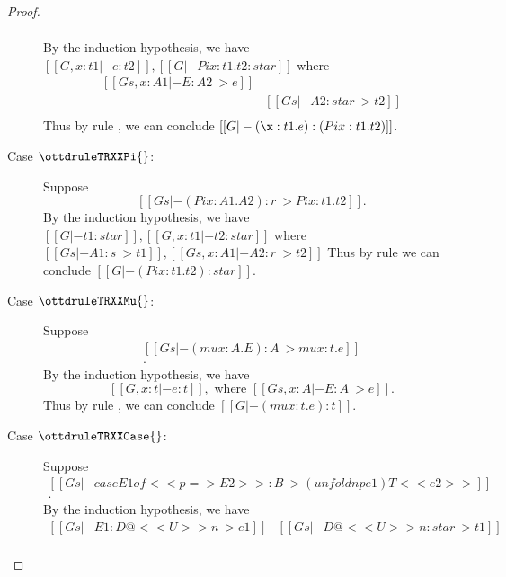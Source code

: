 \begin{proof}
\begin{description}
\[\begin{array}{l}
            \end{array} \]
            By the induction hypothesis, we have 
            $
            [[G, x : t1 |- e:t2]],
            [[G |- Pi x:t1.t2 : star]]
            $
            where 
            \[
            \begin{array}{ll}
            [[Gs, x : A1 |- E : A2 ~> e]] & \\
            [[Gs |- A1 : star ~> t1]] & [[Gs |- A2 : star ~> t2]] \\
            [[Gs |- (Pi x:A1.A2) : s ~> Pi x:t1.t2]] &
            \end{array}
            \]
            Thus by rule , we can conclude $[[G |- (\x:t1.e):(Pi x:t1.t2)]]$.
        \item[Case $\ottdruleTRXXPi{}$:] $\quad$ \\ Suppose 
                \[ [[Gs |- (Pi x:A1.A2):r ~> Pi x:t1.t2]]. \] 
            By the induction hypothesis, we have 
            $
                [[G |- t1 : star]], [[G, x : t1 |- t2 : star]]
            $
            where
            $
                [[Gs |- A1 : s ~> t1]], [[Gs, x: A1 |- A2 : r ~> t2]]
            $
            Thus by rule  we can conclude $[[G |- (Pi x:t1.t2) : star]]$.
        \item[Case $\ottdruleTRXXMu{}$:] $\quad$ \\ Suppose 
                \[\begin{array}{l}
                    [[Gs |- (mu x:A . E):A ~> mu x:t.e]] \\
                    [[Gs |- A : star ~> t]]. 
                \end{array}\]
            By the induction hypothesis, we have 
                \[ [[G, x : t |- e : t]],\text{ where }[[Gs, x:A |- E:A ~> e]]. \] 
            Thus by rule , we can conclude $[[G |- (mu x:t.e) : t]]$.
        \item[Case $\ottdruleTRXXCase{}$:] $\quad$ \\ Suppose 
            \[\begin{array}{l}
                [[Gs |- case E1 of << p => E2>> : B ~> (unfoldnp e1) T <<e2>>]] \\
                [[Gs |- B : star ~> T]].
            \end{array}\]
            By the induction hypothesis, we have 
            \[\begin{array}{ll}
                [[Gs |- E1 : D@<<U>>n ~> e1]] &
                [[Gs |- D@<<U>>n : star ~> t1]] \\

\end{array}\]
\end{description}
\end{proof}

